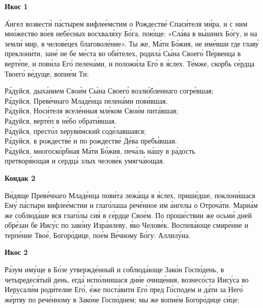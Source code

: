\documentclass[14pt,article,oneside]{memoir}
\begin{document}
\begin{center}
  \textbf{Икос 1}
\end{center}

А́нгел возвести́ па́стырем вифлее́мстим о Рождестве́ Спаси́теля ми́ра, и с ним мно́жество во́ев небе́сных восхваля́ху Бо́га, пою́ще: «Сла́ва в вы́шних Бо́гу, и на земли́ мир, в челове́цех благоволе́ние». Ты же, Ма́ти Бо́жия, не име́вши где главу́ преклони́ти, зане́ не бе ме́ста во оби́телех, родила́ Сы́на Своего́ Пе́рвенца в верте́пе, и пови́ла Его́ пелена́ми, и положи́ла Его́ в я́слех. Те́мже, скорбь се́рдца Твоего́ ве́дуще, вопие́м Ти:

\noindent Ра́дуйся, дыха́нием Свои́м Сы́на Своего́ возлю́бленнаго согре́вшая;\\ Ра́дуйся, Преве́чнаго Младе́нца пелена́ми пови́вшая.\\
Ра́дуйся, Носи́теля вселе́нныя мле́ком Свои́м пита́вшая;\\ Ра́дуйся, верте́п в не́бо обрати́вшая.\\
Ра́дуйся, престо́л херуви́мский соде́лавшаяся;\\ Ра́дуйся, в рождестве́ и по рождестве́ Де́ва пребы́вшая.\\
Ра́дуйся, многоско́рбная Ма́ти Бо́жия, печа́ль на́шу в ра́дость\\ \vin претворя́ющая и сердца́ злых челове́к умягча́ющая.

\pagebreak

\begin{center}
  \textbf{Кондак 2}
\end{center}

Ви́дяще Преве́чнаго Младе́нца пови́та лежа́ща в я́слех, прише́дше, поклони́шася Ему́ па́стыри вифлее́мстии и глаго́лаша рече́нное им а́нгелы о Отроча́ти. Мариа́м же соблюда́ше вся глаго́лы сия́ в се́рдце Свое́м. По проше́ствии же осьми́ дней обре́зан бе Иису́с по зако́ну Изра́илеву, я́ко Челове́к. Воспева́юще смире́ние и терпе́ние Твое́, Богоро́дице, пое́м Ве́чному Бо́гу: Аллилу́иа.

\begin{center}
  \textbf{Икос 2}
\end{center}

Ра́зум иму́ще в Бо́зе утвержде́нный и соблюда́юще Зако́н Госпо́день, в четыредеся́тый день, егда́ испо́лнишася дни́е очище́ния, вознесо́ста Иису́са во Иерусали́м роди́телие Его́, е́же поста́вити Его́ пред Го́сподем и да́ти за Него́ же́ртву по рече́нному в Зако́не Госпо́днем; мы же вопие́м Богоро́дице си́це:
\end{document}
